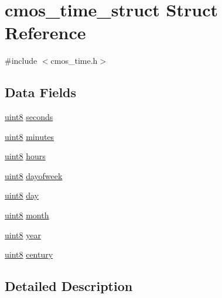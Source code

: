 \hypertarget{structcmos__time__struct}{
\section{cmos\_\-time\_\-struct Struct Reference}
\label{structcmos__time__struct}
}


{\ttfamily \#include $<$cmos\_\-time.h$>$}

\subsection*{Data Fields}
\begin{DoxyCompactItemize}
\item 
\hyperlink{int__types_8h_adde6aaee8457bee49c2a92621fe22b79}{uint8} \hyperlink{structcmos__time__struct_a528b763d67872f0b15849a877388a589}{seconds}
\item 
\hyperlink{int__types_8h_adde6aaee8457bee49c2a92621fe22b79}{uint8} \hyperlink{structcmos__time__struct_a62376ca5b28b9516726695f752656c35}{minutes}
\item 
\hyperlink{int__types_8h_adde6aaee8457bee49c2a92621fe22b79}{uint8} \hyperlink{structcmos__time__struct_a014f38ed5aaa7742dd95cab40cff2df0}{hours}
\item 
\hyperlink{int__types_8h_adde6aaee8457bee49c2a92621fe22b79}{uint8} \hyperlink{structcmos__time__struct_aeecf979ae00d03b270c599663ce9dac9}{dayofweek}
\item 
\hyperlink{int__types_8h_adde6aaee8457bee49c2a92621fe22b79}{uint8} \hyperlink{structcmos__time__struct_a8c8f524958dd79404e7d04136a8a1149}{day}
\item 
\hyperlink{int__types_8h_adde6aaee8457bee49c2a92621fe22b79}{uint8} \hyperlink{structcmos__time__struct_a2821680d4b9916ca33da7bfa156b5508}{month}
\item 
\hyperlink{int__types_8h_adde6aaee8457bee49c2a92621fe22b79}{uint8} \hyperlink{structcmos__time__struct_a0e0a1d380a057c948bf50ed24ac89f78}{year}
\item 
\hyperlink{int__types_8h_adde6aaee8457bee49c2a92621fe22b79}{uint8} \hyperlink{structcmos__time__struct_af4f9659f76e167299202291c7699d19d}{century}
\end{DoxyCompactItemize}


\subsection{Detailed Description}


